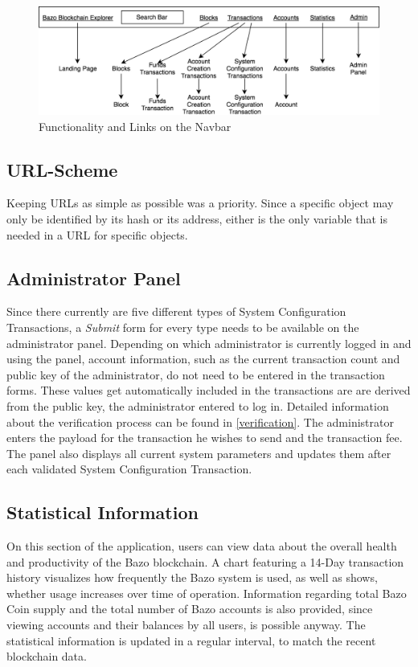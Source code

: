 \begin{figure}
  \includegraphics[scale=0.35]{navbarmockup.png}
  \centering
  \caption{Functionality and Links on the Navbar}
  \label{fig:navbar}
\end{figure}

\subsection{URL-Scheme}
Keeping URLs as simple as possible was a priority. Since a specific object may only be identified by its hash or its address, either is the only variable that is needed in a URL for specific objects.

\subsection{Administrator Panel}
Since there currently are five different types of System Configuration Transactions, a \emph{Submit} form for every type needs to be available on the administrator panel. Depending on which administrator is currently logged in and using the panel, account information, such as the current transaction count and public key of the administrator, do not need to be entered in the transaction forms. These values get automatically included in the transactions are are derived from the public key, the administrator entered to log in. Detailed information about the verification process can be found in \ref{verification}. The administrator enters the payload for the transaction he wishes to send and the transaction fee. The panel also displays all current system parameters and updates them after each validated System Configuration Transaction. 

\subsection{Statistical Information}
On this section of the application, users can view data about the overall health and productivity of the Bazo blockchain. A chart featuring a 14-Day transaction history visualizes how frequently the Bazo system is used, as well as shows, whether usage increases over time of operation. Information regarding total Bazo Coin supply and the total number of Bazo accounts is also provided, since viewing accounts and their balances by all users, is possible anyway. The statistical information is updated in a regular interval, to match the recent blockchain data.

